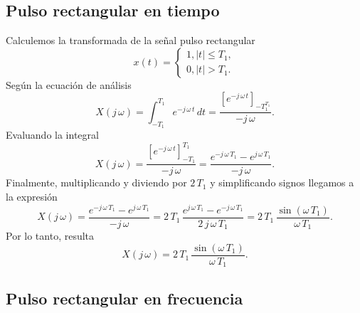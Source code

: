 \subsection{Pulso rectangular en tiempo}

Calculemos la transformada de la se\~{n}al pulso rectangular 
\begin{equation}
x\left( t\right) =
        \left\{ \begin{array}{l}
                1, \left| t\right| \leq T_{1}, \\ 
                0, \left| t\right| > T_{1}.
        \end{array} \right.
\end{equation}
Seg\'{u}n la ecuaci\'{o}n de an\'{a}lisis 
\begin{equation}
        X\left( j \, \omega \right) =
                \int_{-T_{1}}^{T_{1}}e^{-j \, \omega \, t} \, dt=
                \frac{\left[e^{-j \, \omega \, t}\right]_{-T_{1}^{T_{1}}}}{-j \, \omega}.
\end{equation}
Evaluando la integral
\begin{equation}
	X\left( j \, \omega \right) =
	\frac{\left[e^{-j \, \omega \, t}\right]_{-T_{1}}^{T_{1}}}{-j \, \omega} =
	\frac{e^{-j \, \omega \, T_{1}}-e^{j \, \omega \, T_{1}}}{-j \, \omega}.
\end{equation}
Finalmente, multiplicando y diviendo por $2 \, T_{1}$ y simplificando signos llegamos a la expresión
\begin{equation}
	X\left( j \, \omega \right) =
	\frac{e^{-j \, \omega \, T_{1}}-e^{j \, \omega \, T_{1}}}{-j \, \omega} =	
    2 \, T_{1}	\, \frac{e^{j \, \omega \, T_{1}}-e^{-j \, \omega \, T_{1}}}{2 \, j \, \omega \, T_{1}} =	
	2 \, T_{1} \, \frac{\sin\left( \omega \, T_{1}\right) }{\omega \, T_{1}}.
\end{equation}
Por lo tanto, resulta
\begin{equation}
	X\left( j \, \omega \right) =
	2 \, T_{1} \, \frac{\sin\left( \omega \, T_{1}\right) }{\omega \, T_{1}}.
\end{equation}

\subsection{Pulso rectangular en frecuencia}


